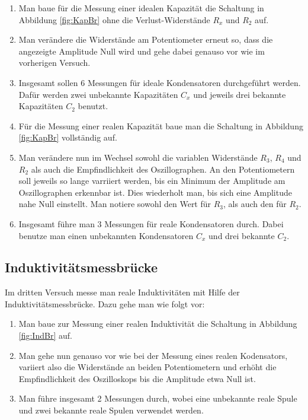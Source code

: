\begin{enumerate}

\item Man baue für die Messung einer idealen Kapazität die Schaltung in Abbildung
\ref{fig:KapBr} ohne die Verlust-Widerstände $R_x$ und $R_2$ auf.

\item Man verändere die Widerstände am Potentiometer erneut so, dass die angezeigte
Amplitude Null wird und gehe dabei genauso vor wie im vorherigen Versuch.

\item Insgesamt sollen 6 Messungen für ideale Kondensatoren durchgeführt werden.
Dafür werden zwei unbekannte Kapazitäten $C_x$ und jeweils drei
bekannte Kapazitäten $C_2$ benutzt.

\item Für die Messung einer realen Kapazität baue man die Schaltung in Abbildung
\ref{fig:KapBr} vollständig auf.

\item Man verändere nun im Wechsel sowohl die variablen Widerstände $R_3$, $R_4$
und $R_2$ als auch die Empfindlichkeit des Oszillographen.
An den Potentiometern soll jeweils so lange varriiert werden, bis ein Minimum
der Amplitude am Oszillographen erkennbar ist. Dies wiederholt man,
bis sich eine Amplitude nahe Null einstellt.
Man notiere sowohl den Wert für $R_3$, als auch den für $R_2$.

\item Insgesamt führe man 3 Messungen für reale Kondensatoren durch. Dabei
benutze man einen unbekannten Kondensatoren $C_x$ und drei bekannte $C_2$.

\end{enumerate}


\subsection{Induktivitätsmessbrücke}

Im dritten Versuch messe man reale Induktivitäten mit Hilfe
der Induktivitätsmessbrücke. Dazu gehe man wie folgt vor:

\begin{enumerate}

\item Man baue zur Messung einer realen Induktivität die Schaltung in Abbildung
\ref{fig:IndBr} auf.

\item Man gehe nun genauso vor wie bei der Messung eines realen Kodensators,
variiert also die Widerstände an beiden Potentiometern und erhöht die
Empfindlichkeit des Oszilloskops bis die Amplitude etwa Null ist.

\item Man führe insgesamt 2 Messungen durch, wobei eine unbekannte reale
Spule und zwei bekannte reale Spulen verwendet werden.

\end{enumerate}


